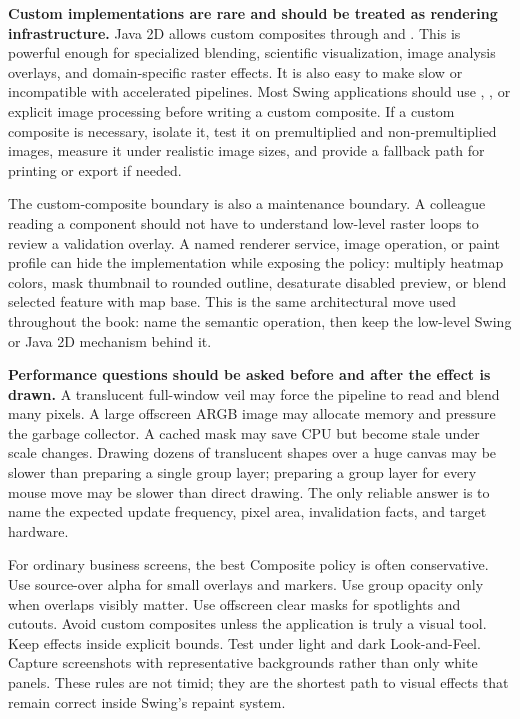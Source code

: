 \textbf{Custom  implementations are rare and should be treated as rendering infrastructure.} Java 2D allows custom composites through  and . This is powerful enough for specialized blending, scientific visualization, image analysis overlays, and domain-specific raster effects. It is also easy to make slow or incompatible with accelerated pipelines. Most Swing applications should use , , or explicit image processing before writing a custom composite. If a custom composite is necessary, isolate it, test it on premultiplied and non-premultiplied images, measure it under realistic image sizes, and provide a fallback path for printing or export if needed.

The custom-composite boundary is also a maintenance boundary. A colleague reading a component should not have to understand low-level raster loops to review a validation overlay. A named renderer service, image operation, or paint profile can hide the implementation while exposing the policy: multiply heatmap colors, mask thumbnail to rounded outline, desaturate disabled preview, or blend selected feature with map base. This is the same architectural move used throughout the book: name the semantic operation, then keep the low-level Swing or Java 2D mechanism behind it.

\textbf{Performance questions should be asked before and after the effect is drawn.} A translucent full-window veil may force the pipeline to read and blend many pixels. A large offscreen ARGB image may allocate memory and pressure the garbage collector. A cached mask may save CPU but become stale under scale changes. Drawing dozens of translucent shapes over a huge canvas may be slower than preparing a single group layer; preparing a group layer for every mouse move may be slower than direct drawing. The only reliable answer is to name the expected update frequency, pixel area, invalidation facts, and target hardware.

For ordinary business screens, the best Composite policy is often conservative. Use source-over alpha for small overlays and markers. Use group opacity only when overlaps visibly matter. Use offscreen clear masks for spotlights and cutouts. Avoid custom composites unless the application is truly a visual tool. Keep effects inside explicit bounds. Test under light and dark Look-and-Feel. Capture screenshots with representative backgrounds rather than only white panels. These rules are not timid; they are the shortest path to visual effects that remain correct inside Swing's repaint system.

